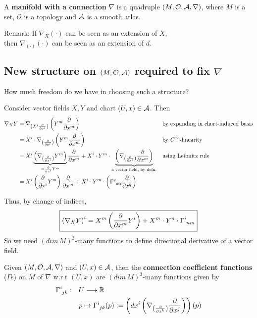 A \textbf{manifold with a connection} $\nabla$ is a quadruple $(M, \mathcal{O}, \mathcal{A}, \nabla)$, where $M$ is a set, $\mathcal{O}$ is a topology and $\mathcal{A}$ is a smooth atlas.

Remark: If $\nabla_X (\cdot)$ can be seen as an extension of $X$, \\
then $\nabla_{(\cdot)}(\cdot)$ can be seen as an extension of $d$.

\subsection{New structure on $(M, \mathcal{O}, \mathcal{A})$ required to fix $\nabla$}
How much freedom do we have in choosing such a structure?

Consider vector fields $X, Y$ and chart $(U,x) \in \mathcal{A}$. Then
\begin{align*}
\nabla_X Y & = \nabla_{\left(X^i \cibasis{x^i}\right)} \left(Y^m \cibasis{x^m}\right) && \text{by expanding in chart-induced basis} \\
& = X^i \cdot \nabla_{\left(\cibasis{x^i}\right)} \left(Y^m \cibasis{x^m}\right) && \text{by }C^\infty\text{-linearity} \\
& = X^i \underbrace{\left(\nabla_{\left(\cibasis{x^i}\right)} Y^m\right)}_{=\cibasis{x^i} Y^m} \cibasis{x^m} + X^i \cdot Y^m \cdot \underbrace{\left(\nabla_{\left(\cibasis{x^i}\right)} \cibasis{x^m}\right)}_{\text{a vector field, by defn.}} && \text{using Leibnitz rule} \\
& =  X^i \left(\cibasis{x^i} Y^m\right) \cibasis{x^m} + X^i \cdot Y^m \cdot \left(\ccf{q}{mi} \cibasis{x^q}\right)
\end{align*}

Thus, by change of indices, 
\begin{equation}
\boxed{\left(\nabla_X Y\right)^i = X^m \left(\cibasis{x^m} Y^i\right) + X^m \cdot Y^n \cdot \ccf{i}{nm}}
\end{equation}
So we need $(dim\,M)^3$-many functions to define directional derivative of a vector field.

\begin{definition}
Given $(M, \mathcal{O}, \mathcal{A}, \nabla)$ and $(U,x) \in \mathcal{A}$, then the \textbf{connection coefficient functions} ($\Gamma$s) on $M$ of $\nabla$ w.r.t $(U,x)$ are $(dim\,M)^3$-many functions given by
\begin{align}
\ccf{i}{jk} : \quad & U \to \R \nonumber \\ 
& p \mapsto \ccf{i}{jk}(p) := \left(dx^i \left(\nabla_{\left(\cibasis{x^k}\right)} \cibasis{x^j}\right)\right)(p)
\end{align}
\end{definition}

